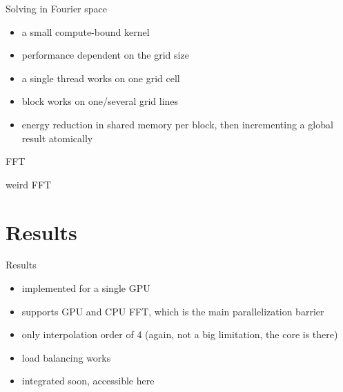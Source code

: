 \documentclass[11pt]{beamer}
\begin{document}
\begin{frame}{Solving in Fourier space}
\begin{itemize}
\item a small compute-bound kernel
\item performance dependent on the grid size
\item a single thread works on one grid cell
\item block works on one/several grid lines
\item energy reduction in shared memory per block, then incrementing a global result atomically
\end{itemize}
\end{frame}


\begin{frame}{FFT}
\end{frame}

\begin{frame}{weird FFT}
\end{frame}

\section{Results}
\begin{frame}{Results}
\begin{itemize}
\item implemented for a single GPU
\item supports GPU and CPU FFT, which is the main parallelization barrier 
\item only interpolation order of 4 (again, not a big limitation, the core is there)
\item load balancing works
\item integrated soon, accessible here
\end{itemize}
\end{frame}
\end{document}
